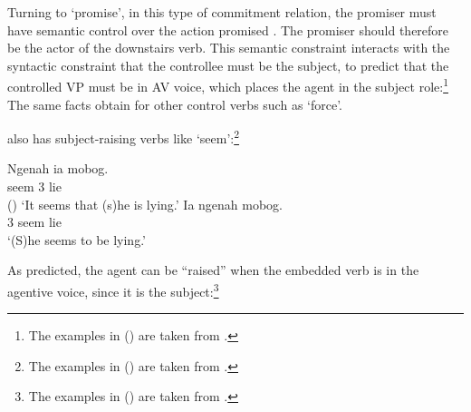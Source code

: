\documentclass[output=paper
	        ,collection
	        ,collectionchapter
 	        ,biblatex
                ,babelshorthands
                ,newtxmath
                ,draftmode
                ,colorlinks, citecolor=brown
]{langscibook}
\begin{document}
Turning to  `promise', in this type of commitment relation, the promiser must have
semantic control over the action promised \citep{Farkas1988,Kroeger1993,SagandPollard1991}\addpages. The
promiser should therefore be the actor of the downstairs verb. This semantic constraint interacts
with the syntactic constraint that the controllee must be the subject, to predict that the
controlled VP must be in AV voice, which places the agent in the subject role:\footnote{%
  The examples in () are taken from .
}
\eal
{}
\zl
The same facts obtain for other control verbs such as  `force'.

 also has subject-raising verbs like  `seem':\footnote{
The examples in () are taken from .
}

\eal
\ex 
\gll Ngenah ia mobog.\\
     seem 3 lie\\\hfill()
\glt `It seems that (s)he is lying.'
\ex 
\gll  Ia ngenah mobog.\\
      3 seem lie\\
\glt `(S)he seems to be lying.'
\zl

As predicted, the agent can be ``raised'' when the embedded verb is in the agentive voice, since it is the subject:\footnote{
The examples in () are taken from .
}

\eal
{}
\zl
\end{document}
